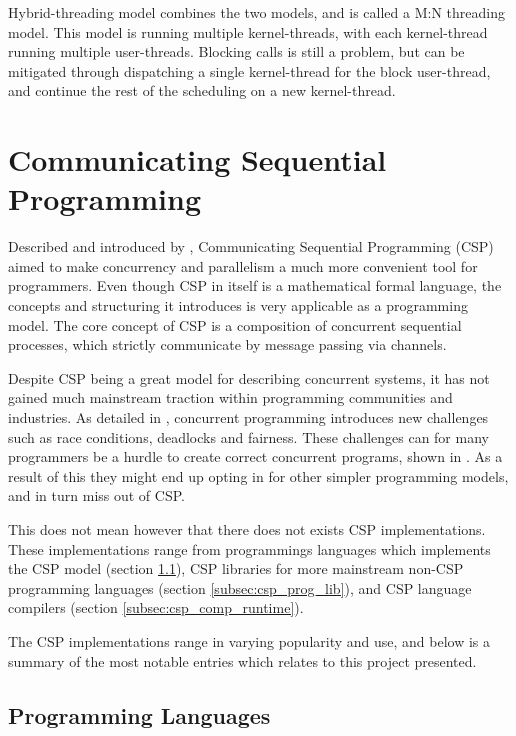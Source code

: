 Hybrid-threading model combines the two models, and is called a M:N threading model. This model is running multiple kernel-threads, with each kernel-thread running multiple user-threads. Blocking calls is still a problem, but can be mitigated through dispatching a single kernel-thread for the block user-thread, and continue the rest of the scheduling on a new kernel-thread. 


\section{Communicating Sequential Programming}
\label{sec:csp}

Described and introduced by \citet{hoarashenhurst1978}, Communicating Sequential Programming (CSP) aimed to make concurrency and parallelism a much more convenient tool for programmers. Even though CSP in itself is a mathematical formal language, the concepts and structuring it introduces is very applicable as a programming model. The core concept of CSP is a composition of concurrent sequential processes, which strictly communicate by message passing via channels.

Despite CSP being a great model for describing concurrent systems, it has not gained much mainstream traction within programming communities and industries. As detailed in \citet{benari2006}, concurrent programming introduces new challenges such as race conditions, deadlocks and fairness. These challenges can for many programmers be a hurdle to create correct concurrent programs, shown in \citet{ousterhour1996}. As a result of this they might end up opting in for other simpler programming models, and in turn miss out of CSP. 

This does not mean however that there does not exists CSP implementations. These implementations range from programmings languages which implements the CSP model (section \ref{subsec:csp_prog_lang}), CSP libraries for more mainstream non-CSP programming languages (section \ref{subsec:csp_prog_lib}), and CSP language compilers (section \ref{subsec:csp_comp_runtime}).

The CSP implementations range in varying popularity and use, and below is a summary of the most notable entries which relates to this project presented.


\subsection{Programming Languages}
\label{subsec:csp_prog_lang}

